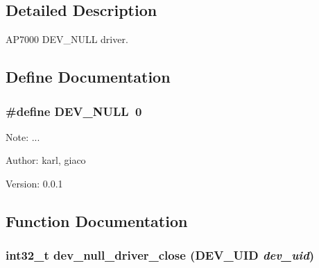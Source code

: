 \subsection{Detailed Description}
AP7000 DEV\_\-NULL driver. 

\subsection{Define Documentation}
\hypertarget{group___d_e_v___n_u_l_l___d_r_i_v_e_r_g8a3ec48b54d63808ed4c386c320fed47}{
\subsubsection[{DEV\_\-NULL}]{\setlength{\rightskip}{0pt plus 5cm}\#define DEV\_\-NULL~0}}
\label{group___d_e_v___n_u_l_l___d_r_i_v_e_r_g8a3ec48b54d63808ed4c386c320fed47}


\begin{Desc}
\item[Note:]... \end{Desc}
\begin{Desc}
\item[Author:]karl, giaco \end{Desc}
\begin{Desc}
\item[Version:]0.0.1 \end{Desc}


\subsection{Function Documentation}
\hypertarget{group___d_e_v___n_u_l_l___d_r_i_v_e_r_gbac6c3a551684ff0db74eb04020ebb26}{
\subsubsection[{dev\_\-null\_\-driver\_\-close}]{\setlength{\rightskip}{0pt plus 5cm}int32\_\-t dev\_\-null\_\-driver\_\-close ({\bf DEV\_\-UID} {\em dev\_\-uid})}}
\label{group___d_e_v___n_u_l_l___d_r_i_v_e_r_gbac6c3a551684ff0db74eb04020ebb26}


